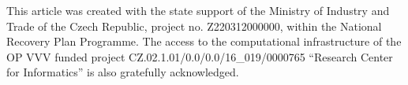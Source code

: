 \documentclass[11pt]{article}
\begin{document}
This article was created with the state support of the Ministry of Industry and Trade of the Czech Republic, project no. Z220312000000, within the National Recovery Plan Programme.
The access to the computational infrastructure of the OP VVV funded project CZ.02.1.01/0.0/0.0/16\_019/0000765 ``Research Center for Informatics'' is also gratefully acknowledged.






\appendix



%
%
\end{document}
